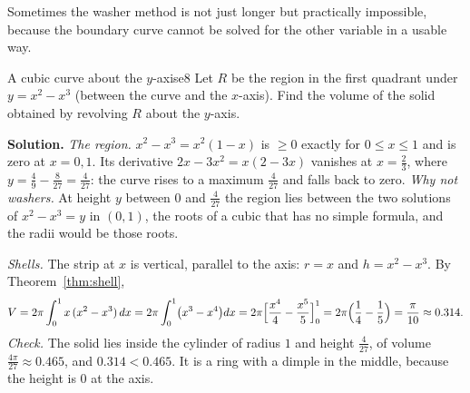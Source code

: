 \documentclass[11pt]{article}
\begin{document}
Sometimes the washer method is not just longer but practically impossible, because the boundary curve cannot be solved for the other variable in a usable way.

\begin{exmp}{A cubic curve about the $y$-axis}{e8}
Let $R$ be the region in the first quadrant under $y=x^2-x^3$ (between the curve and the $x$-axis). Find the volume of the solid obtained by revolving $R$ about the $y$-axis.

\textbf{Solution.} \emph{The region.} $x^2-x^3=x^2(1-x)$ is $\ge0$ exactly for $0\le x\le1$ and is zero at $x=0,1$. Its derivative $2x-3x^2=x(2-3x)$ vanishes at $x=\frac23$, where $y=\frac49-\frac8{27}=\frac4{27}$: the curve rises to a maximum $\frac4{27}$ and falls back to zero.
\emph{Why not washers.} At height $y$ between $0$ and $\frac4{27}$ the region lies between the two solutions of $x^2-x^3=y$ in $(0,1)$, the roots of a cubic that has no simple formula, and the radii would be those roots.

\emph{Shells.} The strip at $x$ is vertical, parallel to the axis: $r=x$ and $h=x^2-x^3$. By Theorem~\ref{thm:shell},
\[
V=2\pi\int_0^1x\,(x^2-x^3)\,dx=2\pi\int_0^1\bigl(x^3-x^4\bigr)dx=2\pi\Bigl[\frac{x^4}4-\frac{x^5}5\Bigr]_0^1=2\pi\Bigl(\frac14-\frac15\Bigr)=\frac{\pi}{10}\approx0.314 .
\]
\emph{Check.} The solid lies inside the cylinder of radius $1$ and height $\frac4{27}$, of volume $\frac{4\pi}{27}\approx0.465$, and $0.314<0.465$. It is a ring with a dimple in the middle, because the height is $0$ at the axis.


\end{exmp}
\end{document}
